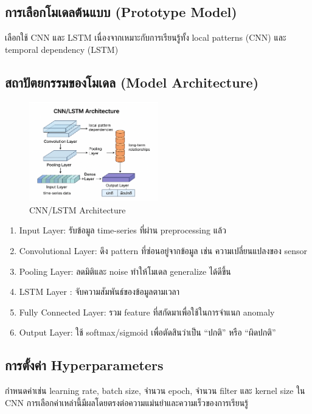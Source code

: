 \subsection{การเลือกโมเดลต้นแบบ (Prototype Model)}
\hspace{2em} เลือกใช้ CNN และ LSTM เนื่องจากเหมาะกับการเรียนรู้ทั้ง local patterns (CNN) และ temporal dependency (LSTM)

\subsection{สถาปัตยกรรมของโมเดล (Model Architecture)}

\begin{figure}[h]
\begin{center}
\includegraphics[width=0.5\textwidth]{Image/CNN-LSTM Arch.png}
\end{center}
\caption[CNN/LSTM Architecture]{CNN/LSTM Architecture}
\end{figure}

\begin{enumerate}
  \item Input Layer: รับข้อมูล time-series ที่ผ่าน preprocessing แล้ว
  \item Convolutional Layer: ดึง pattern ที่ซ่อนอยู่จากข้อมูล เช่น ความเปลี่ยนแปลงของ sensor
  \item Pooling Layer: ลดมิติและ noise ทำให้โมเดล generalize ได้ดีขึ้น
  \item LSTM Layer : จับความสัมพันธ์ของข้อมูลตามเวลา
  \item Fully Connected Layer: รวม feature ที่สกัดมาเพื่อใช้ในการจำแนก anomaly
  \item Output Layer: ใช้ softmax/sigmoid เพื่อตัดสินว่าเป็น “ปกติ” หรือ “ผิดปกติ”
\end{enumerate}

\subsection{การตั้งค่า Hyperparameters}
\hspace{2em} กำหนดค่าเช่น learning rate, batch size, จำนวน epoch, จำนวน filter และ kernel size ใน CNN การเลือกค่าเหล่านี้มีผลโดยตรงต่อความแม่นยำและความเร็วของการเรียนรู้

